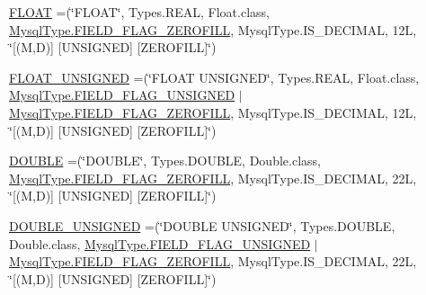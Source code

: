 \begin{DoxyCompactItemize}
\item 
\mbox{\hyperlink{enumcom_1_1mysql_1_1cj_1_1_mysql_type_ae8cf970114766445c4e064ee748fb74c}{F\+L\+O\+AT}} =(\char`\"{}F\+L\+O\+AT\char`\"{}, Types.\+R\+E\+AL, Float.\+class, \mbox{\hyperlink{enumcom_1_1mysql_1_1cj_1_1_mysql_type_abb76a1f2f3dac9a30d1b559b8ba66a48}{Mysql\+Type.\+F\+I\+E\+L\+D\+\_\+\+F\+L\+A\+G\+\_\+\+Z\+E\+R\+O\+F\+I\+LL}}, Mysql\+Type.\+I\+S\+\_\+\+D\+E\+C\+I\+M\+AL, 12\+L, \char`\"{}\mbox{[}(\+M,\+D)\mbox{]} \mbox{[}\+U\+N\+S\+I\+G\+N\+E\+D\mbox{]} \mbox{[}\+Z\+E\+R\+O\+F\+I\+L\+L\mbox{]}\char`\"{})
\item 
\mbox{\hyperlink{enumcom_1_1mysql_1_1cj_1_1_mysql_type_a095a818e7723ff0543eaed09f06694fa}{F\+L\+O\+A\+T\+\_\+\+U\+N\+S\+I\+G\+N\+ED}} =(\char`\"{}F\+L\+O\+AT U\+N\+S\+I\+G\+N\+ED\char`\"{}, Types.\+R\+E\+AL, Float.\+class, \mbox{\hyperlink{enumcom_1_1mysql_1_1cj_1_1_mysql_type_a2c6701614559b1ad9955cdc4ca6337e2}{Mysql\+Type.\+F\+I\+E\+L\+D\+\_\+\+F\+L\+A\+G\+\_\+\+U\+N\+S\+I\+G\+N\+ED}} $\vert$ \mbox{\hyperlink{enumcom_1_1mysql_1_1cj_1_1_mysql_type_abb76a1f2f3dac9a30d1b559b8ba66a48}{Mysql\+Type.\+F\+I\+E\+L\+D\+\_\+\+F\+L\+A\+G\+\_\+\+Z\+E\+R\+O\+F\+I\+LL}}, Mysql\+Type.\+I\+S\+\_\+\+D\+E\+C\+I\+M\+AL, 12\+L, \char`\"{}\mbox{[}(\+M,\+D)\mbox{]} \mbox{[}\+U\+N\+S\+I\+G\+N\+E\+D\mbox{]} \mbox{[}\+Z\+E\+R\+O\+F\+I\+L\+L\mbox{]}\char`\"{})
\item 
\mbox{\hyperlink{enumcom_1_1mysql_1_1cj_1_1_mysql_type_a3f95bc5758ff4e4f6ce9cd1fb1889400}{D\+O\+U\+B\+LE}} =(\char`\"{}D\+O\+U\+B\+LE\char`\"{}, Types.\+D\+O\+U\+B\+LE, Double.\+class, \mbox{\hyperlink{enumcom_1_1mysql_1_1cj_1_1_mysql_type_abb76a1f2f3dac9a30d1b559b8ba66a48}{Mysql\+Type.\+F\+I\+E\+L\+D\+\_\+\+F\+L\+A\+G\+\_\+\+Z\+E\+R\+O\+F\+I\+LL}}, Mysql\+Type.\+I\+S\+\_\+\+D\+E\+C\+I\+M\+AL, 22\+L, \char`\"{}\mbox{[}(\+M,\+D)\mbox{]} \mbox{[}\+U\+N\+S\+I\+G\+N\+E\+D\mbox{]} \mbox{[}\+Z\+E\+R\+O\+F\+I\+L\+L\mbox{]}\char`\"{})
\item 
\mbox{\hyperlink{enumcom_1_1mysql_1_1cj_1_1_mysql_type_a9ca99746f8ab3f53a3b0b9ad9599f5c0}{D\+O\+U\+B\+L\+E\+\_\+\+U\+N\+S\+I\+G\+N\+ED}} =(\char`\"{}D\+O\+U\+B\+LE U\+N\+S\+I\+G\+N\+ED\char`\"{}, Types.\+D\+O\+U\+B\+LE, Double.\+class, \mbox{\hyperlink{enumcom_1_1mysql_1_1cj_1_1_mysql_type_a2c6701614559b1ad9955cdc4ca6337e2}{Mysql\+Type.\+F\+I\+E\+L\+D\+\_\+\+F\+L\+A\+G\+\_\+\+U\+N\+S\+I\+G\+N\+ED}} $\vert$ \mbox{\hyperlink{enumcom_1_1mysql_1_1cj_1_1_mysql_type_abb76a1f2f3dac9a30d1b559b8ba66a48}{Mysql\+Type.\+F\+I\+E\+L\+D\+\_\+\+F\+L\+A\+G\+\_\+\+Z\+E\+R\+O\+F\+I\+LL}}, Mysql\+Type.\+I\+S\+\_\+\+D\+E\+C\+I\+M\+AL, 22\+L, \char`\"{}\mbox{[}(\+M,\+D)\mbox{]} \mbox{[}\+U\+N\+S\+I\+G\+N\+E\+D\mbox{]} \mbox{[}\+Z\+E\+R\+O\+F\+I\+L\+L\mbox{]}\char`\"{})

\end{DoxyCompactItemize}
